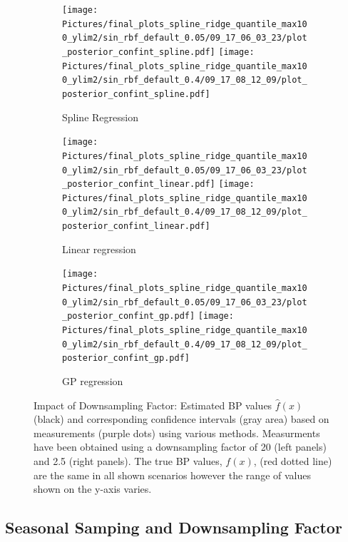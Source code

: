 \begin{figure}
\begin{subfigure}{\textwidth}
    \centering
    \texttt{[image: 
        Pictures/final\_plots\_spline\_ridge\_quantile\_max100\_ylim2/sin\_rbf\_default\_0.05/09\_17\_06\_03\_23/plot\_posterior\_confint\_spline.pdf]}
    \texttt{[image: 
    Pictures/final\_plots\_spline\_ridge\_quantile\_max100\_ylim2/sin\_rbf\_default\_0.4/09\_17\_08\_12\_09/plot\_posterior\_confint\_spline.pdf]}
  \caption{Spline Regression }
\end{subfigure}

\begin{subfigure}{\textwidth}
    \centering
    \texttt{[image: 
        Pictures/final\_plots\_spline\_ridge\_quantile\_max100\_ylim2/sin\_rbf\_default\_0.05/09\_17\_06\_03\_23/plot\_posterior\_confint\_linear.pdf]}
    \texttt{[image: 
  Pictures/final\_plots\_spline\_ridge\_quantile\_max100\_ylim2/sin\_rbf\_default\_0.4/09\_17\_08\_12\_09/plot\_posterior\_confint\_linear.pdf]}
  \caption{Linear regression }
\end{subfigure}

\begin{subfigure}{\textwidth}
    \centering
    \texttt{[image: 
        Pictures/final\_plots\_spline\_ridge\_quantile\_max100\_ylim2/sin\_rbf\_default\_0.05/09\_17\_06\_03\_23/plot\_posterior\_confint\_gp.pdf]}
    \texttt{[image: 
  Pictures/final\_plots\_spline\_ridge\_quantile\_max100\_ylim2/sin\_rbf\_default\_0.4/09\_17\_08\_12\_09/plot\_posterior\_confint\_gp.pdf]}
  \caption{GP regression}
\end{subfigure}\hfill

\caption[Impact of Downsampling Factor]{Impact of Downsampling Factor:
    Estimated BP values $\hat{f}(x)$ (black) and corresponding confidence intervals
    (gray area) based on measurements (purple dots) using various methods.
    Measurments have been obtained using a
    downsampling factor of 20 (left panels) and 2.5 (right panels).
    The true BP values, $f(x)$, (red dotted line) are the same in all shown
    scenarios however the range of values shown on the y-axis varies.
    }
\label{fig:ex-downsampling-factor}
\end{figure}

\subsection{Seasonal Samping and Downsampling Factor}




